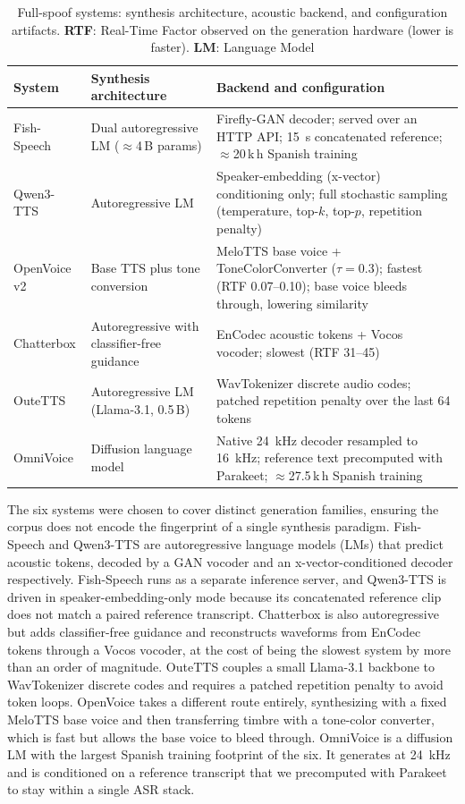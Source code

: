 \documentclass[11pt]{article}
\begin{document}
\begin{table}[H]
\centering
\caption{Full-spoof systems: synthesis architecture, acoustic backend,
and configuration artifacts. \textbf{RTF}: Real-Time Factor observed on the generation hardware (lower is faster). \textbf{LM}: Language Model}
\label{tab:systems}
\small
\begin{tabular}{p{2.1cm}p{3.5cm}p{7cm}}
\toprule
\textbf{System} & \textbf{Synthesis architecture} & \textbf{Backend and configuration} \\
\midrule
Fish-Speech & Dual autoregressive LM ($\approx$4\,B params) & Firefly-GAN decoder; served over an HTTP API; \SI{15}{\second} concatenated reference; $\approx$20\,k\,h Spanish training \\
Qwen3-TTS & Autoregressive LM & Speaker-embedding (x-vector) conditioning only; full stochastic sampling (temperature, top-$k$, top-$p$, repetition penalty) \\
OpenVoice v2 & Base TTS plus tone conversion & MeloTTS base voice + ToneColorConverter ($\tau=0.3$); fastest (RTF 0.07--0.10); base voice bleeds through, lowering similarity \\
Chatterbox & Autoregressive with classifier-free guidance & EnCodec acoustic tokens + Vocos vocoder; slowest (RTF 31--45) \\
OuteTTS & Autoregressive LM (Llama-3.1, 0.5\,B) & WavTokenizer discrete audio codes; patched repetition penalty over the last 64 tokens \\
OmniVoice & Diffusion language model & Native \SI{24}{\kilo\hertz} decoder resampled to \SI{16}{\kilo\hertz}; reference text precomputed with Parakeet; $\approx$27.5\,k\,h Spanish training \\
\bottomrule
\end{tabular}
\end{table}

The six systems were chosen to cover distinct generation families,
ensuring the corpus does not encode the fingerprint of a single
synthesis paradigm. Fish-Speech and Qwen3-TTS are autoregressive language models (LMs)
that predict acoustic tokens, decoded by a GAN vocoder and an
x-vector-conditioned decoder respectively. Fish-Speech runs as a
separate inference server, and Qwen3-TTS is driven in
speaker-embedding-only mode because its concatenated reference clip does
not match a paired reference transcript. Chatterbox is also
autoregressive but adds classifier-free guidance and reconstructs
waveforms from EnCodec tokens through a Vocos vocoder, at the cost of
being the slowest system by more than an order of magnitude. OuteTTS
couples a small Llama-3.1 backbone to WavTokenizer discrete codes and
requires a patched repetition penalty to avoid token loops. OpenVoice
takes a different route entirely, synthesizing with a fixed MeloTTS
base voice and then transferring timbre with a tone-color converter, which
is fast but allows the base voice to bleed through. OmniVoice is a diffusion
LM with the largest Spanish training footprint of the six.
It generates at \SI{24}{\kilo\hertz} and is conditioned on a reference
transcript that we precomputed with Parakeet to stay within a single ASR
stack.
\end{document}
